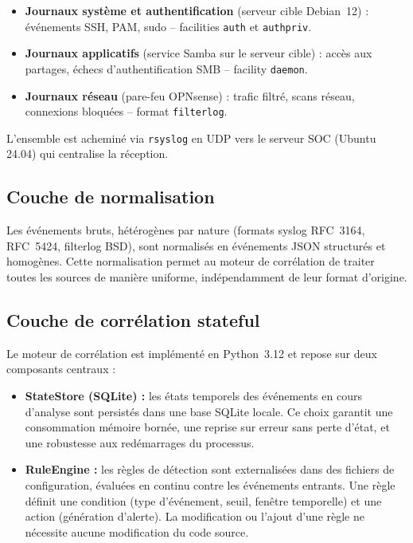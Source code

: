 \documentclass[a4paper,12pt]{article}
\begin{document}
\begin{itemize}
    \item \textbf{Journaux système et authentification} (serveur cible
    Debian~12) : événements SSH, PAM, sudo -- facilities
    \texttt{auth} et \texttt{authpriv}.

    \item \textbf{Journaux applicatifs} (service Samba sur le serveur
    cible) : accès aux partages, échecs d'authentification SMB --
    facility \texttt{daemon}.

    \item \textbf{Journaux réseau} (pare-feu OPNsense) : trafic filtré,
    scans réseau, connexions bloquées -- format \texttt{filterlog}.
\end{itemize}

L'ensemble est acheminé via \texttt{rsyslog} en UDP vers le serveur SOC
(Ubuntu 24.04) qui centralise la réception.

\subsection*{Couche de normalisation}

Les événements bruts, hétérogènes par nature (formats syslog RFC~3164,
RFC~5424, filterlog BSD), sont normalisés en événements JSON structurés
et homogènes. Cette normalisation permet au moteur de corrélation de
traiter toutes les sources de manière uniforme, indépendamment de leur
format d'origine.

\subsection*{Couche de corrélation stateful}

Le moteur de corrélation est implémenté en Python~3.12 et repose sur
deux composants centraux :

\begin{itemize}
    \item \textbf{StateStore (SQLite) :} les états temporels des
    événements en cours d'analyse sont persistés dans une base SQLite
    locale. Ce choix garantit une consommation mémoire bornée, une
    reprise sur erreur sans perte d'état, et une robustesse aux
    redémarrages du processus.

    \item \textbf{RuleEngine :} les règles de détection sont externalisées
    dans des fichiers de configuration, évaluées en continu contre les
    événements entrants. Une règle définit une condition (type
    d'événement, seuil, fenêtre temporelle) et une action (génération
    d'alerte). La modification ou l'ajout d'une règle ne nécessite aucune
    modification du code source.
\end{itemize}
\end{document}
